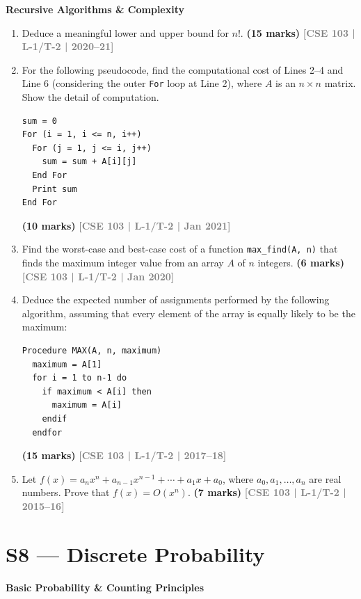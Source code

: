 \documentclass[12pt,a3paper]{article}
\newcommand{\yr}[1]{\hfill\textcolor{gray}{\small\textbf{[#1]}}}
\newcommand{\mk}[1]{\textcolor{orange!70!black}{\small\textbf{(#1 marks)}}}
\newcommand{\subtopic}[2]{%
  \vspace{10pt}
  \noindent\begin{tcolorbox}[colback=#1!8,colframe=#1,boxrule=0.6pt,arc=4pt,
    left=6pt,right=6pt,top=4pt,bottom=4pt]
    \small\bfseries\textcolor{#1}{#2}
  \end{tcolorbox}
  \vspace{2pt}
}
\begin{document}
\subtopic{cD}{Recursive Algorithms \& Complexity}

\begin{enumerate}

\item Deduce a meaningful lower and upper bound for $n!$.
\mk{15} \yr{CSE 103 | L-1/T-2 | 2020--21}

\item For the following pseudocode, find the computational cost of Lines 2--4 and Line 6 (considering the outer \texttt{For} loop at Line 2), where $A$ is an $n \times n$ matrix. Show the detail of computation.
\begin{lstlisting}
sum = 0
For (i = 1, i <= n, i++)
  For (j = 1, j <= i, j++)
    sum = sum + A[i][j]
  End For
  Print sum
End For
\end{lstlisting}
\mk{10} \yr{CSE 103 | L-1/T-2 | Jan 2021}


\item Find the worst-case and best-case cost of a function \texttt{max\_find(A, n)} that finds the maximum integer value from an array $A$ of $n$ integers.
\mk{6} \yr{CSE 103 | L-1/T-2 | Jan 2020}


\item Deduce the expected number of assignments performed by the following algorithm, assuming that every element of the array is equally likely to be the maximum:
\begin{lstlisting}
Procedure MAX(A, n, maximum)
  maximum = A[1]
  for i = 1 to n-1 do
    if maximum < A[i] then
      maximum = A[i]
    endif
  endfor
\end{lstlisting}
\mk{15} \yr{CSE 103 | L-1/T-2 | 2017--18}  

\item Let $f(x) = a_n x^n + a_{n-1} x^{n-1} + \cdots + a_1 x + a_0$, where $a_0, a_1, \ldots, a_n$ are real numbers. Prove that $f(x) = O(x^n)$.
\mk{7} \yr{CSE 103 | L-1/T-2 | 2015--16}


\end{enumerate}

\section{S8 --- Discrete Probability}
\label{sec:S8}

\subtopic{cD}{Basic Probability \& Counting Principles}
\label{sub:s8-basicprob}
\end{document}
